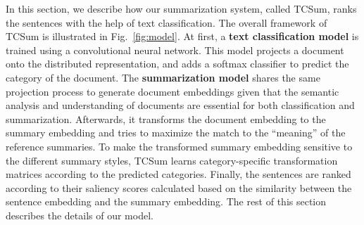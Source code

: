 \documentclass[letterpaper]{article}
\begin{document}


In this section, we describe how our summarization system, called TCSum, ranks the sentences with the help of text classification.
The overall framework of TCSum is illustrated in Fig.~\ref{fig:model}.
At first, a \textbf{text classification model} is trained using a convolutional neural network.
This model projects a document onto the distributed representation, and adds a softmax classifier to predict the category of the document. 
The \textbf{summarization model} shares the same projection process to generate document embeddings given that the semantic analysis and understanding of documents are essential for both classification and summarization.
Afterwards, it transforms the document embedding to the summary embedding and tries to maximize the match to the ``meaning'' of the reference summaries.
To make the transformed summary embedding sensitive to the different summary styles, TCSum learns category-specific transformation matrices according to the predicted categories.
Finally, the sentences are ranked according to their saliency scores calculated based on the similarity between the sentence embedding and the summary embedding.
The rest of this section describes the details of our model.

\end{document}
